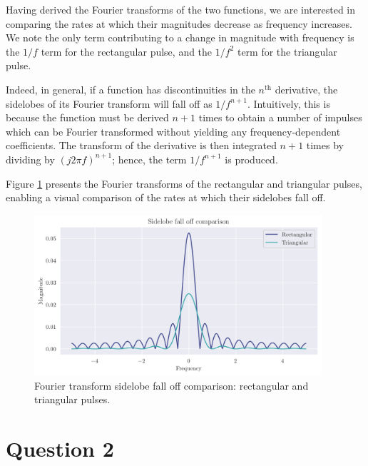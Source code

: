 \documentclass[a4paper, 11pt]{article}
\begin{document}
Having derived the Fourier transforms of the two functions, we are interested in
comparing the rates at which their magnitudes decrease as frequency increases.
We note the only term contributing to a change in magnitude with frequency is
the $1/f$ term for the rectangular pulse, and the $1/f^2$ term for the
triangular pulse.

Indeed, in general, if a function has discontinuities in the $n^\text{th}$
derivative, the sidelobes of its Fourier transform will fall off as $1/f^{n+1}$.
Intuitively, this is because the function must be derived $n+1$ times to obtain
a number of impulses which can be Fourier transformed without yielding any
frequency-dependent coefficients. The transform of the derivative is then
integrated $n+1$ times by dividing by $(j2\pi f)^{n+1}$; hence, the term
$1/f^{n+1}$ is produced.

\newpage

Figure \ref{fig:q1_sidelobes} presents the Fourier transforms of the rectangular
and triangular pulses, enabling a visual comparison of the rates at which their
sidelobes fall off.

\begin{figure}[ht]
    \includegraphics[width=0.95\textwidth]{images/q1_sidelobes.png}
    \caption{Fourier transform sidelobe fall off comparison: rectangular and
             triangular pulses.}
    \label{fig:q1_sidelobes}
\end{figure}

\newpage
\section*{Question 2}
\end{document}
